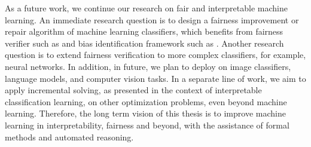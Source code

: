 As a future work, we continue our research on fair and interpretable machine learning. An immediate research question is to design a fairness improvement or repair algorithm of machine learning classifiers, which benefits from fairness verifier such as {\justicia} and bias identification framework such as {\fairXplainer}. Another research question is to extend fairness verification to more complex classifiers, for example, neural networks. In addition, in future, we plan to deploy {\fairXplainer} on image classifiers, language models, and computer vision tasks. In a separate line of work, we aim to apply incremental solving, as presented in the context of interpretable classification learning, on other optimization problems, even beyond machine learning. Therefore, the long term vision of this thesis is to improve machine learning in interpretability, fairness and beyond, with the assistance of formal methods and automated reasoning.


\begin{comment}
	\begin{itemize}
		\item Fairness repair
		\item Incremental solving
		\item Fairness and interpretability as a service to more complex models.
	\end{itemize}
\end{comment}
